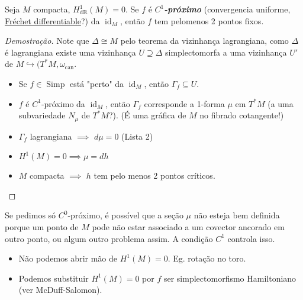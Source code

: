 \begin{prop}
	Seja $M$ compacta, $H^{1}_{\operatorname{dR}}(M)=0$. Se $f$ \'e  \textit{\textbf{$C^1$-pr\'oximo}} (convergencia uniforme, \href{https://en.wikipedia.org/wiki/Compact-open_topology#Fr%C3%A9chet_differentiable_functions}{Fr\'echet differentiable}?) da $\operatorname{id}_M$, ent\~ao $f$ tem pelomenos 2 pontos fixos.
\end{prop}

\begin{proof}[Demostra\c c\~ao]
	 Note que $\Delta \cong M$ pelo teorema da vizinhança lagrangiana, como $\Delta$ \'e lagrangiana existe uma vizinhança $U\supseteq \Delta$ simplectomorfa a uma vizinhança $U'$ de  $M\hookrightarrow (T^* M,\omega_{\operatorname{can}}$.

	 \begin{itemize}
	 \item Se $f\in\operatorname{Simp}$ est\'a "perto" da $\operatorname{id}_M$, ent\~ao $\Gamma_f\subseteq U$.

	\item $f$ \'e $C^1$-pr\'oximo da $\operatorname{id}_M$, ent\~ao $\Gamma_f$ corresponde a 1-forma $\mu$ em $T^*M$ (a uma subvariedade $N_\mu$ de  $T^*M$?). (\'E uma gr\'afica de $M$ no fibrado cotangente!)

	\item $\Gamma_f$ lagrangiana  $\implies $ $d\mu=0$ (Lista 2)

	 \item $H^{1}(M)=0\implies \mu=dh$
	
	\item $M$ compacta $\implies $ $h$ tem pelo menos 2 pontos cr\'iticos.
	 \end{itemize}
\end{proof}

\begin{remark}[Monitoria]
	Se pedimos s\'o $C^0$-pr\'oximo, \'e poss\'ivel que a se\c c\~ao $\mu$ n\~ao esteja bem definida porque um ponto de $M$ pode n\~ao estar associado a um covector ancorado em outro ponto, ou algum outro problema assim. A condi\c c\~ao $C^1$ controla isso. 
\end{remark}

\begin{remark}\leavevmode 
	\begin{itemize}
	\item N\~ao podemos abrir m\~ao de $H^{1}(M)=0$. Eg. rota\c c\~ao no toro.

	\item Podemos substituir $H^{1}(M)=0$ por $f$ ser simplectomorfismo Hamiltoniano (ver McDuff-Salomon).
	\end{itemize}
\end{remark}

